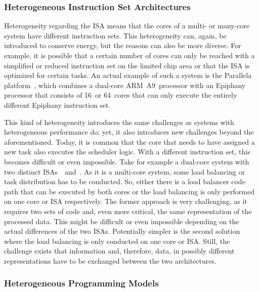 \subsubsection{Heterogeneous Instruction Set Architectures}%
\label{sec:env:hetero_isa}

Heterogeneity regarding the \ac{ISA} means that the cores of a multi- or many-core system have different instruction sets. This heterogeneity can, again, be introduced to conserve energy, but the reasons can also be more diverse. For example, it is possible that a certain number of cores can only be reached with a simplified or reduced instruction set on the limited chip area or that the \ac{ISA} is optimized for certain tasks. An actual example of such a system is the Parallela platform~\cite{Parallella-2014-Manual}, which combines a dual-core ARM~A9~processor with an Epiphany processor that consists of 16~or 64~cores that can only execute the entirely different Epiphany instruction set.

This kind of heterogeneity introduces the same challenges as systems with heterogeneous performance do; yet, it also introduces new challenges beyond the aforementioned. Today, it is common that the core that needs to have assigned a new task also executes the scheduler logic. With a different instruction set, this becomes difficult or even impossible. Take for example a dual-core system with two distinct \acp{ISA}~\textalpha{}~and~\textbeta{}. As it is a multi-core system, some load balancing or task distribution has to be conducted. So, either there is a load balancer code path that can be executed by both cores or the load balancing is only performed on one core or \ac{ISA} respectively. The former approach is very challenging, as it requires two sets of code and, even more critical, the same representation of the processed data. This might be difficult or even impossible depending on the actual differences of the two \acp{ISA}. Potentially simpler is the second solution where the load balancing is only conducted on one core or \ac{ISA}. Still, the challenge exists that information and, therefore, data, in possibly different representations have to be exchanged between the two architectures.

\subsubsection{Heterogeneous Programming Models}

